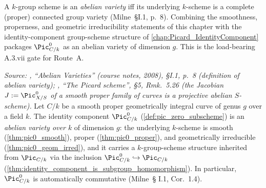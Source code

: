 A \(k\)-group scheme is an \emph{abelian variety} iff its underlying
\(k\)-scheme is a complete (proper) connected group variety
(Milne~\S I.1, p.~8). Combining the smoothness, properness, and
geometric irreducibility statements of this chapter with the
identity-component group-scheme structure of
\cref{chap:Picard_IdentityComponent} packages \(\Pic^0_{C/k}\) as an
abelian variety of dimension \(g\). This is the load-bearing A.3.vii
gate for Route~A.

\begin{theorem}\leanok
  \label{thm:pic0_isAbelianVariety}

  \textit{Source: \cite{milne-av}, ``Abelian Varieties'' (course notes, 2008),
  \S I.1, p.~8 (definition of abelian variety); \cite{kleiman-picard}, ``The
  Picard scheme'', \S 5, Rmk.~5.26 (the Jacobian
  \(J := \Pic^0_{X/S}\) of a smooth proper family of curves is a
  projective abelian \(S\)-scheme).}
  Let \(C/k\) be a smooth proper geometrically integral curve of
  genus \(g\) over a field \(k\). The identity component
  \(\Pic^0_{C/k}\) (\cref{def:pic_zero_subscheme}) is an
  \emph{abelian variety over \(k\)} of dimension \(g\): the underlying
  \(k\)-scheme is smooth (\cref{thm:pic0_smooth}), proper
  (\cref{thm:pic0_proper}), and geometrically irreducible
  (\cref{thm:pic0_geom_irred}), and it carries a \(k\)-group-scheme
  structure inherited from \(\Pic_{C/k}\) via the inclusion
  \(\Pic^0_{C/k} \hookrightarrow \Pic_{C/k}\)
  (\cref{thm:identity_component_is_subgroup_homomorphism}). In
  particular, \(\Pic^0_{C/k}\) is automatically commutative (Milne~\S
  I.1, Cor.~1.4).
\end{theorem}

